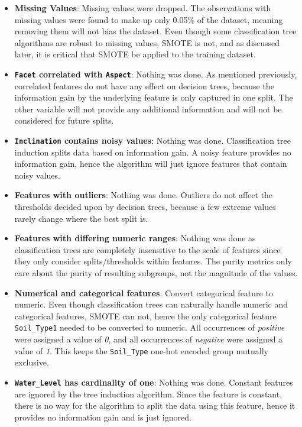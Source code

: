 \documentclass[conference]{IEEEtran}
\begin{document}
\begin{itemize}
    \item \textbf{Missing Values}: Missing values were dropped. The observations with missing values were found to make up only 0.05\% of the dataset, meaning removing them will not bias the dataset. Even though some classification tree algorithms are robust to missing values, SMOTE is not, and as discussed later, it is critical that SMOTE be applied to the training dataset.
    \item \textbf{\texttt{Facet} correlated with \texttt{Aspect}}: Nothing was done. As mentioned previously, correlated features do not have any effect on decision trees, because the information gain by the underlying feature is only captured in one split. The other variable will not provide any additional information and will not be considered for future splits.
    \item \textbf{\texttt{Inclination} contains noisy values}: Nothing was done. Classification tree induction splits data based on information gain. A noisy feature provides no information gain, hence the algorithm will just ignore features that contain noisy values.
    \item \textbf{Features with outliers}: Nothing was done. Outliers do not affect the thresholds decided upon by decision trees, because a few extreme values rarely change where the best split is.
    \item \textbf{Features with differing numeric ranges}: Nothing was done as classification trees are completely insensitive to the scale of features since they only consider splits/thresholds within features. The purity metrics only care about the purity of resulting subgroups, not the magnitude of the values.
    \item \textbf{Numerical and categorical features}: Convert categorical feature to numeric. Even though classification trees can naturally handle numeric and categorical features, SMOTE can not, hence the only categorical feature \texttt{Soil\_Type1} needed to be converted to numeric. All occurrences of \textit{positive} were assigned a value of \textit{0}, and all occurrences of \textit{negative} were assigned a value of \textit{1}. This keeps the \texttt{Soil\_Type} one-hot encoded group mutually exclusive.
    \item \textbf{\texttt{Water\_Level} has cardinality of one}: Nothing was done. Constant features are ignored by the tree induction algorithm. Since the feature is constant, there is no way for the algorithm to split the data using this feature, hence it provides no information gain and is just ignored.

\end{itemize}
\end{document}

